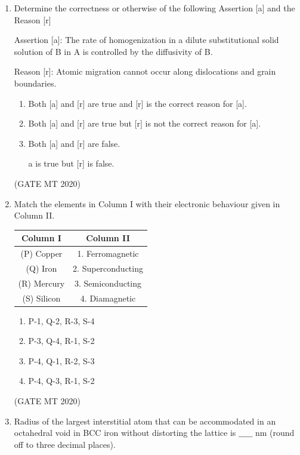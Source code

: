 \documentclass[journal, 11pt, onecolumn]{IEEEtran}
\theoremstyle{remark}
\begin{document}
\begin{enumerate}
\item Determine the correctness or otherwise of the following Assertion [a] and the Reason [r]  

Assertion [a]: The rate of homogenization in a dilute substitutional solid solution of B in A is controlled by the diffusivity of B.  

Reason [r]: Atomic migration cannot occur along dislocations and grain boundaries.  

\begin{enumerate} 
\item Both [a] and [r] are true and [r] is the correct reason for [a].  
\item Both [a] and [r] are true but [r] is not the correct reason for [a].  
\item Both [a] and [r] are false.  
\item [a] is true but [r] is false.  
\end{enumerate}
\hfill(GATE MT 2020)


\item Match the elements in Column I with their electronic behaviour given in Column II.  

\begin{center}
\begin{tabular}{|c|c|}
\hline
\textbf{Column I} & \textbf{Column II} \\
\hline
(P) Copper & 1. Ferromagnetic \\
(Q) Iron & 2. Superconducting \\
(R) Mercury & 3. Semiconducting \\
(S) Silicon & 4. Diamagnetic \\
\hline
\end{tabular}
\end{center}

\begin{enumerate} 
\item P-1, Q-2, R-3, S-4  
\item P-3, Q-4, R-1, S-2  
\item P-4, Q-1, R-2, S-3  
\item P-4, Q-3, R-1, S-2  
\end{enumerate}
\hfill(GATE MT 2020)

\item Radius of the largest interstitial atom that can be accommodated in an octahedral void in BCC iron without distorting the lattice is $\_\_\_\_\_$ nm (round off to three decimal places).  


\end{enumerate}
\end{document}
